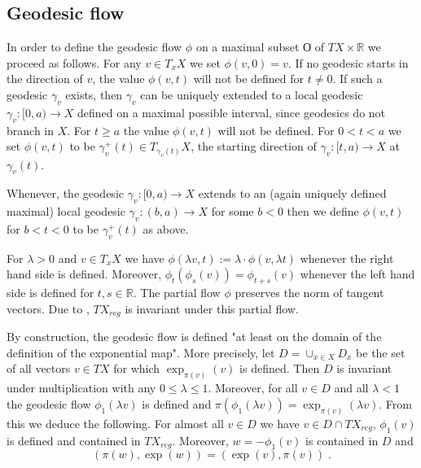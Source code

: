 \documentclass[12pt,leqno]{amsart}
\numberwithin{equation}{section}
\theoremstyle{definition}
\theoremstyle{remark}
\newcommand{\R}{\mathbb{R}}
\def\:{\colon}
\begin{document}
\subsection{Geodesic flow}
   In order to define the geodesic flow $\phi$ on a maximal subset $О$ of $TX \times \R $  we proceed as follows.
 For any  $v\in  T_xX$ we set $\phi (v,0)=v$.
 If no geodesic starts in the direction of $v$,
 the value $\phi (v,t)$ will not be defined for $t\neq 0$. If such a geodesic $\gamma_v$ exists, then $\gamma_v$   can be uniquely extended to a  local geodesic $\gamma_v \:[0,a)\to X$  defined on a maximal possible interval, since  geodesics do not branch in $X$.  For $t\geq a$
 the value $\phi (v,t)$ will not be defined. For $0<t<a$ we set $\phi (v,t)$ to be $\gamma _v ^+ (t) \in T_{\gamma _v(t)} X$, the starting direction of $\gamma_v\:[t,a) \to X$ at $\gamma_v (t)$.

 Whenever, the geodesic $\gamma _v\:[0,a)\to X$ extends to an (again uniquely defined maximal)  local geodesic   $\gamma_v\:(b,a) \to X$ for some $b<0$
 then we define $\phi (v,t)$ for $b<t<0$ to be $\gamma_v ^+ (t) $ as above.


For $\lambda >0$ and $v\in  T_x X$ we have  $\phi (\lambda v,t) :=\lambda \cdot \phi (v,\lambda t)$ whenever the right hand side is defined. Moreover,
 $\phi _t ( \phi _s (v))= \phi _{t+s} (v)$ whenever the left hand side is defined for $t,s\in \R$.
The partial flow $\phi$ preserves the norm of tangent vectors.  Due to \cite{Petparallel},  $TX_{reg}$ is invariant under this partial flow.



By construction, the geodesic flow is defined "at least on the domain of the definition of the exponential map".
More precisely, let $D=\cup _{x\in X} D_x$ be the set of all vectors $v\in TX$ for which $\exp _{\pi(v)} (v)$ is defined.
Then $D$ is invariant under multiplication with any $0\leq \lambda \leq 1$.  Moreover, for all $v\in D$ and all $\lambda <1$
the geodesic flow $\phi_1 (\lambda v)$ is defined and $\pi (\phi_1 (\lambda v))=  \exp _{\pi (v)} (\lambda v)$.
From this we deduce the following.
 For almost all $v\in D$ we have $v\in D\cap TX_{reg}$, $\phi _1(v)$ is defined  and contained in $TX_{reg}$. Moreover,
 $w=-\phi_1 (v)$ is contained in $D$  and 
\begin{equation} \label{eq:symm}
(\pi (w), \exp (w))=(\exp (v), \pi (v))\; .
\end{equation}
\end{document}
